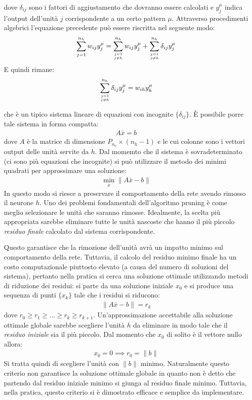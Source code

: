 dove $\delta_{ij}$ sono i fattori di aggiustamento che dovranno essere calcolati e $y_j^\mu$ indica l'output dell'unità $j$ corrispondente a un certo pattern $\mu$.
Attraverso procedimenti algebrici l'equazione precedente può essere riscritta nel seguente modo:
\begin{align*}
	\sum_{j = 1}^{n_h}  w_{ij} y^\mu_j = 
	\sum_{j = 1 \atop j \neq h} ^ {n_h} w_{ij} y^\mu_j + 
	\sum_{j = 1 \atop j \neq h} ^ {n_h} \delta_{ij} y^\mu_j
\end{align*}
E quindi rimane:
\begin{align*}
	\sum_{j = 1 \atop j \neq h} ^ {n_h} \delta_{ij} y^\mu_j =
	w_{ih} y^\mu_h
\end{align*}

che è un tipico sistema lineare di equazioni con incognite $\{\delta_{ij}\}$. È possibile porre tale sistema in forma compatta:
\begin{align*}
	A \bar{x} = b
\end{align*}
dove $A$ è la matrice di dimensione $P_{n_o} \times (n_h - 1)$ e le cui colonne sono i vettori output delle unità servite da $h$. Dal momemto che il sistema è sovradeterminato (ci sono più equazioni che incognite) si può utilizzare il metodo dei minimi quadrati per approssimare una soluzione:
\begin{align}
    \min_{\bar{x}} \|A \bar{x} - b\|
\end{align}
In questo modo si riesce a preservare il comportamento della rete avendo rimosso il neurone $h$. Uno dei problemi fondamentali dell'algoritmo pruning è come meglio selezionare le unità che saranno rimosse. Idealmente, la scelta più appropriata sarebbe eliminare tutte le unità nascoste che hanno il più piccolo \emph{residuo finale} calcolato dal sistema corrispondente.

\newpage

Questo garantisce che la rimozione dell'unità avrà un impatto minimo sul comportamento della rete. Tuttavia, il calcolo del residuo minimo finale ha un costo computazionale piuttosto elevato (a causa del numero di soluzioni del sistema), pertanto nella pratica si cerca una soluzione ottimale utilizzando metodi di riduzione dei residui: si parte da una soluzione iniziale $x_0$ e si produce una sequenza di punti $\{ x_k \}$ tale che i residui si riducono: 
\begin{align*}
	 \|A \bar{x} - b\| = r_k
\end{align*}
dove $r_0 \geq r_1 \geq \dots \geq r_k \geq r_{k + 1}$. Un'approssimazione accettabile alla soluzione ottimale globale sarebbe scegliere l'unità $h$ da eliminare in modo tale che il \emph{residuo iniziale} sia il più piccolo. Dal momento che $x_0$ di solito è il vettore nullo allora:
\begin{align*}
	x_0 = 0 \implies r_0 = \| b \|
\end{align*}
Si tratta quindi di scegliere l'unità con $\| b \|$ minimo. Naturalmente questo criterio non garantisce la soluzione ottimale globale in quanto non è detto che partendo dal residuo iniziale minimo si giunga al residuo finale minimo. Tuttavia, nella pratica, questo criterio si è dimostrato efficace e semplice da implementare.\\

